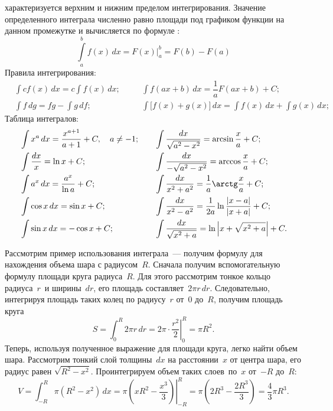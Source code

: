  характеризуется верхним и нижним пределом интегрирования. Значение определенного интеграла численно равно площади под графиком функции на данном промежутке и вычисляется по формуле :
\begin{equation}
	\int\limits^b_a f(x) \,d x = F(x) \biggr|^b_a = F(b) - F(a)
\end{equation}
Правила интегрирования:
\begin{align*}
	&\int c f(x) \,d x = c \int f(x) \,d x;\quad &&  \int f(ax + b) \,d x = \dfrac{1}{a}F(ax + b) + C;\\
	&\int f \,d g = fg - \int g \,d f; && \int \bigl[f(x) + g(x)\bigr] \,d x = \int f(x) \,d x + \int g(x) \,d x;
\end{align*}
Таблица интегралов:
\begin{align*}
	&\int  x^a \,d x = \dfrac{x^{a+1}}{a+1} + C,\quad a \neq -1; \quad
	&&\int \dfrac{dx}{\sqrt{a^2 - x^2}} = \arcsin\dfrac{x}{a} + C;\\
	&\int \frac{dx}{x} = \ln x + C;
	&&\int \dfrac{dx}{-\sqrt{a^2 - x^2}} = \arccos\dfrac{x}{a} + C;\\
	&\int a^x \,d x = \dfrac{a^x}{\ln a} + C;
	&&\int \dfrac{dx}{x^2 + a^2} = \dfrac{1}{a} \arctg \dfrac{x}{a} + C; \\
	&\int \cos x \,d x = \sin x + C;
	&&\int \dfrac{dx}{x^2 - a^2} = \dfrac{1}{2a} \ln \dfrac{|x - a|}{|x + a|} + C;\\
	&\int \sin x \,d x = -\cos x + C;
	&&\int \dfrac{dx}{\sqrt{x^2 + a}} = \ln \left| x + \sqrt{x^2 + a} \right| + C.
\end{align*}

Рассмотрим пример использования интеграла~--- получим формулу для нахождения объема шара с радиусом~$R$. Сначала получим вспомогательную формулу площади круга радиуса~$R$. Для этого рассмотрим тонкое кольцо радиуса~$r$~и ширины~$dr$, его площадь составляет~$2\pi r \,d r$. Следовательно, интегрируя площадь таких колец по радиусу~$r$ от~$0$ до~$R$, получим площадь круга
\begin{equation*}
    S = \int_0^R 2 \pi r \,d r = 2 \pi \cdot \left.\frac{r^2}{2} \right|_0^R = \pi R^2.
\end{equation*}
Теперь, используя полученное выражение для площади круга, легко найти объем шара. Рассмотрим тонкий слой толщины~$dx$ на расстоянии~$x$ от центра шара, его радиус равен $\sqrt{R^2 - x^2}$. Проинтегрируем объем таких слоев~по~$x$ от~$-R$ до~$R$:
\begin{equation*}
    V 
        = \int_{-R}^{R} \pi (R^2 - x^2) \,d x 
        = \pi \left.\left(xR^2 - \frac{x^3}{3}\right)\right|_{-R}^{R}
        = \pi \left(2R^3 - \frac{2R^3}{3} \right) 
        = \frac{4}{3} \pi R^3.
\end{equation*}

